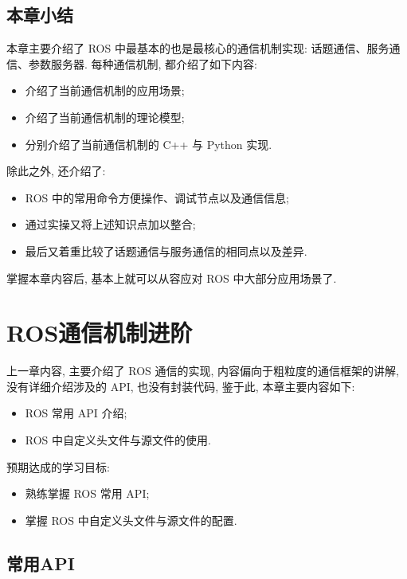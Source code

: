 \documentclass[openany, fontset=windowsold]{ctexbook}
\theoremstyle{kaiti}
\theoremstyle{normal}
\begin{document}
\section{本章小结}

本章主要介绍了 ROS 中最基本的也是最核心的通信机制实现: 话题通信、服务通信、参数服务器. 每种通信机制, 都介绍了如下内容:

\begin{itemize}
  \item 介绍了当前通信机制的应用场景; 
  \item 介绍了当前通信机制的理论模型; 
  \item 分别介绍了当前通信机制的 C++ 与 Python 实现.
\end{itemize}

除此之外, 还介绍了:

\begin{itemize}
  \item ROS 中的常用命令方便操作、调试节点以及通信信息; 
  \item 通过实操又将上述知识点加以整合; 
  \item 最后又着重比较了话题通信与服务通信的相同点以及差异.
\end{itemize}

掌握本章内容后, 基本上就可以从容应对 ROS 中大部分应用场景了.

\chapter{ROS通信机制进阶}
\label{chapter:ros_communication_advanced}

上一章内容, 主要介绍了 ROS 通信的实现, 内容偏向于粗粒度的通信框架的讲解, 没有详细介绍涉及的 API, 也没有封装代码, 鉴于此, 本章主要内容如下:

\begin{itemize}
  \item ROS 常用 API 介绍; 
  \item ROS 中自定义头文件与源文件的使用.
\end{itemize}

预期达成的学习目标:

\begin{itemize}
  \item 熟练掌握 ROS 常用 API; 
  \item 掌握 ROS 中自定义头文件与源文件的配置.
\end{itemize}

\section{常用API}
\end{document}
